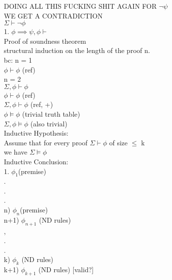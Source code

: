 \documentclass[12pt,oneside,notitlepage]{book}
\theoremstyle{definition}
\begin{document}
DOING ALL THIS FUCKING SHIT AGAIN FOR $\neg \psi$ \\
WE GET A CONTRADICTION \\

$\Sigma \vdash \neg \phi$ \\


1. $\phi \implies \psi, \phi \vdash$  \\
 
 
Proof of soundness theorem \\
structural induction on the length of the proof n. \\
bc: n = 1 \\
$\phi \vdash \phi$ (ref) \\
n = 2 \\
$\Sigma, \phi \vdash \phi$ \\
$\phi \vdash \phi$ (ref) \\
$\Sigma, \phi \vdash \phi$ (ref, +) \\
 
$\phi \vDash \phi$ (trivial truth table) \\
$\Sigma, \phi \vDash \phi$ (also trivial) \\

Inductive Hypothesis: \\
Assume that for every proof $\Sigma \vdash \phi$ of size $\leq$ k \\
we have $\Sigma \vDash \phi$ \\
 
Inductive Conclusion: \\
1. $\phi_1 $(premise) \\
. \\
. \\
. \\
n) $\phi_n $(premise) \\
n+1) $\phi_{n+1}$ (ND rules) \\
, \\
. \\
. \\
k) $\phi_k$ (ND rules) \\
k+1) $\phi_{k+1}$ (ND rules) [valid?] \\
\end{document}

